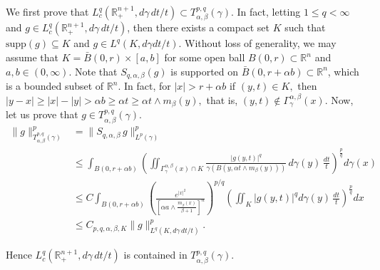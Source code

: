 \documentclass[leqno,11pt]{amsart}
\theoremstyle{plain}
\theoremstyle{remark}
\begin{document}
{{{ 

We first prove that $L_c^{q}(\mathbb{R}^{n+1}_+,d\gamma\, dt/t) \subset T^{p,q}_{\alpha,\beta}(\gamma)$. In fact, letting $1\le q<\infty$ and $g \in 
 L_c^{q}(\mathbb{R}^{n+1}_+,d\gamma\, dt/t)$, then there exists a compact set $K$ such that
$\text{supp}(g)\subseteq K$ and $g \in L^q(K, d\gamma dt/t)$. Without loss of generality, we may assume that $K= \bar{B}\left(0, r\right) \times[a, b]$ for some open ball $B\left(0, r\right) \subset \mathbb{R}^n$ and $a, b \in(0, \infty)$.
Note that $S_{q,\alpha, \beta}(g)$ is supported on $\bar{B}\left(0, r+\alpha b\right) \subset \mathbb{R}^n$, which is a bounded subset of $\mathbb{R}^n$. In fact, for $|x|>r+\alpha b$ if $(y,t)\in K,$ then $|y-x|\ge |x|-|y|>\alpha b\ge \alpha t\ge \alpha t\wedge m_\beta(y),$ that is, $(y,t)\notin \Gamma_\gamma^{\alpha, \beta}(x).$
Now, let us prove that $g\in T_{\alpha, \beta}^{p,q}(\gamma).$
\begin{align*}
\|g\|_{T_{\alpha,\beta}^{p,q}(\gamma)}^p &  =\|S_{q,\alpha, \beta}\, g\|^p_{L^p(\gamma)} \\
& \leq \int_{B\left(0, r+\alpha b\right) }\left(\iint_{\Gamma_\gamma^{\alpha, \beta}(x)\cap K}\frac{|g(y,t)|^q}{\gamma(B(y,\alpha t\wedge m_\beta(y)))}\,d\gamma(y)\,\frac{dt}{t}\right)^{\frac{p}{q}} d \gamma(x) \\
& \leq C \int_{B\left(0, r+\alpha b\right)}\left(\frac{e^{|x|^2}}{\left[\alpha a\wedge \frac{m_\beta(x)}{\beta+1}\right]^{n}}\right)^{p/q} \left(\iint_{K} |g(y, t)|^q d\gamma(y)\, \frac{dt}{t}\right)^{\frac{p}{q}} dx\\
& \leq  C_{p,q,\alpha,\beta, K}\|g\|_{L^q(K, d\gamma\, dt/t)}^p .
\end{align*}

Hence $L_c^{q}(\mathbb{R}^{n+1}_+,d\gamma\, dt/t)$ is contained in $T^{p,q}_{\alpha,\beta}(\gamma).$


}}}
\end{document}

